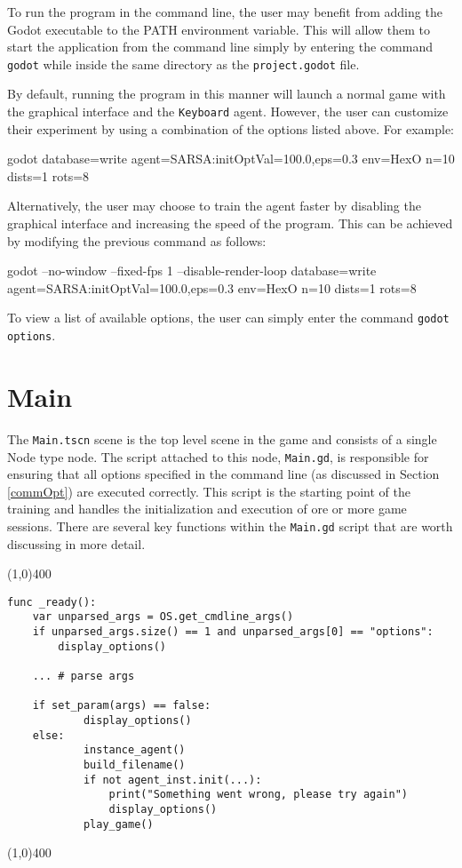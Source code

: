 To run the program in the command line, the user may benefit from adding the Godot executable to the PATH environment variable. This will allow them to start the application from the command line simply by entering the command \texttt{godot} while inside the same directory as the \texttt{project.godot} file.

By default, running the program in this manner will launch a normal game with the graphical interface and the \texttt{Keyboard} agent. However, the user can customize their experiment by using a combination of the options listed above. For example:

\begin{algorithm}
\begin{algorithmic}
\State godot database=write agent=SARSA:initOptVal=100.0,eps=0.3 env=HexO n=10 dists=1 rots=8
\end{algorithmic}
\end{algorithm}

Alternatively, the user may choose to train the agent faster by disabling the graphical interface and increasing the speed of the program. This can be achieved by modifying the previous command as follows:

\begin{algorithm}
\begin{algorithmic}
\State godot --no-window --fixed-fps 1 --disable-render-loop database=write agent=SARSA:initOptVal=100.0,eps=0.3 env=HexO n=10 dists=1 rots=8
\end{algorithmic}
\end{algorithm}

To view a list of available options, the user can simply enter the command \texttt{godot options}.

\section{Main}
The \texttt{Main.tscn} scene is the top level scene in the game and consists of a single Node type node. The script attached to this node, \texttt{Main.gd}, is responsible for ensuring that all options specified in the command line (as discussed in Section \ref{commOpt}) are executed correctly. This script is the starting point of the training and handles the initialization and execution of ore or more game sessions.
There are several key functions within the \texttt{Main.gd} script that are worth discussing in more detail.

\begin{center}
\line(1,0){400}
\begin{lstlisting}
func _ready():
	var unparsed_args = OS.get_cmdline_args()
	if unparsed_args.size() == 1 and unparsed_args[0] == "options":
		display_options()
		
	...	# parse args
	
	if set_param(args) == false:
    		display_options()
	else:
    		instance_agent()
    		build_filename()
    		if not agent_inst.init(...):
        		print("Something went wrong, please try again")
        		display_options()
    		play_game()
\end{lstlisting}
\line(1,0){400}
\end{center}

